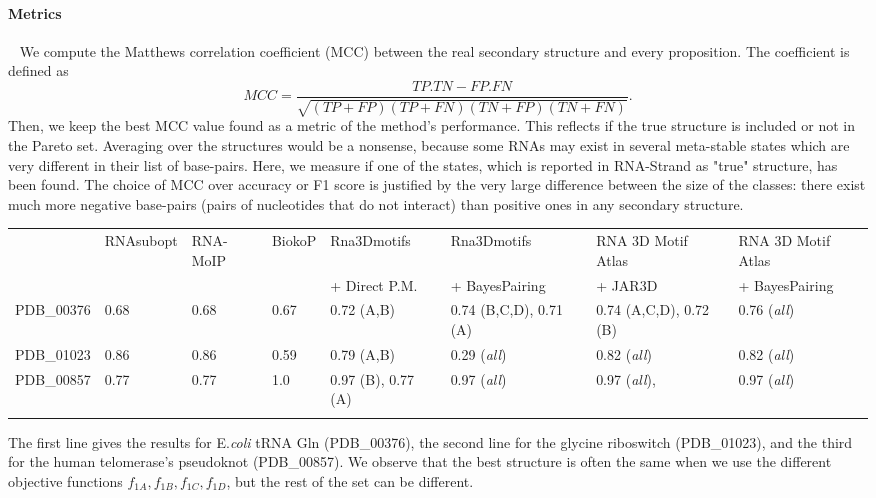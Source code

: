 \documentclass{bioinfo}
\begin{document}
\paragraph{Metrics} ~ We compute the Matthews correlation coefficient (MCC) between the real secondary structure and every proposition. The coefficient is defined as
\begin{equation}
   MCC = \frac{TP. TN - FP. FN}{\sqrt{(TP+FP)(TP+FN)(TN+FP)(TN+FN)}}. \label{eq:MCC}
\end{equation}
Then, we keep the best MCC value found as a metric of the method's performance. This reflects if the true structure is included or not in the Pareto set. Averaging over the structures would be a nonsense, because some RNAs may exist in several meta-stable states which are very different in their list of base-pairs. Here, we measure if one of the states, which is reported in RNA-Strand as "true" structure, has been found. The choice of MCC over accuracy or F1 score is justified by the very large difference between the size of the classes: there exist much more negative base-pairs (pairs of nucleotides that do not interact) than positive ones in any secondary structure.

\begin{table}[!t]
 {
\begin{tabular}{@{}rlllllll@{}}\toprule & RNAsubopt & RNA-MoIP & BiokoP & Rna3Dmotifs & Rna3Dmotifs & RNA 3D Motif Atlas & RNA 3D Motif Atlas\\
 & & & & + Direct P.M. & + BayesPairing & + JAR3D & + BayesPairing \\\midrule
PDB\_00376 & 0.68 & 0.68 & 0.67 & 0.72 (A,B) & 0.74 (B,C,D), 0.71 (A) & 0.74 (A,C,D), 0.72 (B) & 0.76 (\textit{all})\\
PDB\_01023 & 0.86 & 0.86 & 0.59 & 0.79 (A,B) & 0.29 (\textit{all}) & 0.82 (\textit{all}) & 0.82 (\textit{all})\\
PDB\_00857 & 0.77 & 0.77 & 1.0 & 0.97 (B), 0.77 (A) & 0.97 (\textit{all}) & 0.97 (\textit{all}), & 0.97 (\textit{all})\\\botrule
\end{tabular}}{The first line gives the results for E.\textit{coli} tRNA Gln  (PDB\_00376), the second line for the glycine riboswitch (PDB\_01023), and the third for the human telomerase's pseudoknot (PDB\_00857). We observe that the best structure is often the same when we use the different objective functions $f_{1A}, f_{1B}, f_{1C}, f_{1D}$, but the rest of the set can be different.}
\end{table}
\end{document}
